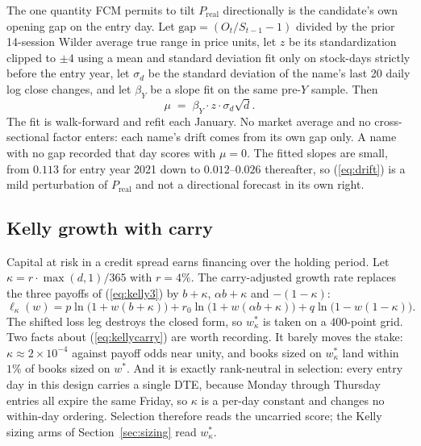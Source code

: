 \documentclass[11pt]{article}
\newcommand{\Preal}{P_{\mathrm{real}}}
\begin{document}
The one quantity FCM permits to tilt $\Preal$ directionally is the
candidate's own opening gap on the entry day. Let
$\mathrm{gap} = (O_t / S_{t-1} - 1)$ divided by the prior 14-session Wilder
average true range in price units, let $z$ be its standardization clipped to
$\pm 4$ using a mean and standard deviation fit only on stock-days strictly
before the entry year, let $\sigma_d$ be the standard deviation of the name's
last 20 daily log close changes, and let $\beta_Y$ be a slope fit on the same
pre-$Y$ sample. Then
\begin{equation}
\mu \;=\; \beta_Y \cdot z \cdot \sigma_d \sqrt{d} .
\label{eq:drift}
\end{equation}
The fit is walk-forward and refit each January. No market average and no
cross-sectional factor enters: each name's drift comes from its own gap only.
A name with no gap recorded that day scores with $\mu = 0$. The fitted slopes
are small, from $0.113$ for entry year 2021 down to $0.012$--$0.026$
thereafter, so (\ref{eq:drift}) is a mild perturbation of $\Preal$ and not a
directional forecast in its own right.

\subsection{Kelly growth with carry}
\label{sec:carry}

Capital at risk in a credit spread earns financing over the holding period. Let
$\kappa = r \cdot \max(d, 1)/365$ with $r = 4\%$. The carry-adjusted growth
rate replaces the three payoffs of (\ref{eq:kelly3}) by $b + \kappa$,
$\alpha b + \kappa$ and $-(1 - \kappa)$:
\begin{equation}
\ell_\kappa(w) = p \ln\!\bigl(1 + w(b + \kappa)\bigr)
+ r_0 \ln\!\bigl(1 + w(\alpha b + \kappa)\bigr)
+ q \ln\!\bigl(1 - w(1 - \kappa)\bigr).
\label{eq:kellycarry}
\end{equation}
The shifted loss leg destroys the closed form, so $w^\ast_\kappa$ is taken on
a $400$-point grid. Two facts about (\ref{eq:kellycarry}) are worth recording.
It barely moves the stake: $\kappa \approx 2\times 10^{-4}$ against payoff
odds near unity, and books sized on $w^\ast_\kappa$ land within $1\%$ of books
sized on $w^\ast$. And it is exactly rank-neutral in selection: every entry
day in this design carries a single DTE, because Monday through Thursday
entries all expire the same Friday, so $\kappa$ is a per-day constant and
changes no within-day ordering. Selection therefore reads the uncarried score;
the Kelly sizing arms of Section~\ref{sec:sizing} read $w^\ast_\kappa$.
\end{document}
